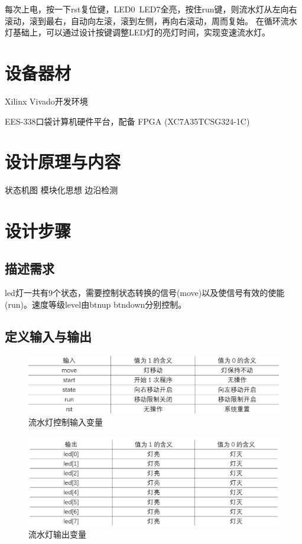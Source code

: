 \documentclass[UTF8]{article}
\begin{document}
每次上电，按一下rst复位键，LED0~LED7全亮，按住run键，则流水灯从左向右滚动，滚到最右，自动向左滚，滚到左侧，再向右滚动，周而复始。
在循环流水灯基础上，可以通过设计按键调整LED灯的亮灯时间，实现变速流水灯。


\section{设备器材}
Xilinx Vivado开发环境

EES-338口袋计算机硬件平台，配备 FPGA (XC7A35TCSG324-1C)

\section{设计原理与内容}

状态机图
模块化思想
边沿检测


\section{设计步骤}
\subsection{描述需求}

led灯一共有9个状态，需要控制状态转换的信号(move)以及使信号有效的使能(run)。速度等级level由btnup btndown分别控制。
\subsection{定义输入与输出}

\begin{figure}[htbp]
    \centering
    \includegraphics[scale=0.7]{流水灯控制输入变量.PNG}
    \caption{流水灯控制输入变量}
\end{figure}

\begin{figure}[htbp]
    \centering
    \includegraphics[scale=0.7]{流水灯输出变量.PNG}
    \caption{流水灯输出变量}
\end{figure}
\end{document}
